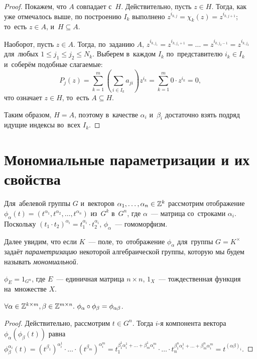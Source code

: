 \documentclass[a4paper,oneside]{article}
\begin{document}
\begin{proof}
  Покажем, что $A$ совпадает с~$H$. Действительно, пусть $z \in H$. Тогда, как уже отмечалось выше,
  по построению $I_k$ выполнено $z^{i_{k, j}} = \chi_k(z) = z^{i_{k, j + 1}}$; то~есть $z \in A$, и~$H \subseteq A$.

  Наоборот, пусть $z \in A$. Тогда, по~заданию $A$, $z^{i_{k, j_1}} = z^{i_{k, j_1 + 1}} = \ldots = z^{i_{k, j_2 - 1}} = z^{i_{k, j_2}}$
  для~любых $1 \leq j_1 \leq j_2 \leq N_k$. Выберем в~каждом $I_k$ по~представителю $i_k \in I_k$ и~соберём подобные слагаемые:
  \[
    P_j(z) = \sum_{k = 1}^{m} \left( \sum_{i \in I_k} a_{ji} \right) z^{i_k} = \sum_{k = 1}^{m} 0 \cdot z^{i_k} = 0,
  \]
  что означает $z \in H$, то~есть $A \subseteq H$.

  Таким образом, $H = A$, поэтому в~качестве $\alpha_i$ и~$\beta_i$ достаточно взять подряд идущие индексы во~всех $I_k$.
\end{proof}

\section{Мономиальные параметризации и их свойства}
Для~абелевой группы $G$ и~векторов $\alpha_1, \ldots, \alpha_n \in \mathbb{Z}^k$ рассмотрим отображение $\phi_\alpha(t) = (t^{\alpha_1}, t^{\alpha_2}, \ldots, t^{\alpha_n})$
из~$G^k$ в~$G^n$, где $\alpha$~— матрица со~строками $\alpha_i$. Поскольку $(t_1 \cdot t_2)^{\alpha_i} = t_1^{\alpha_i} \cdot t_2^{\alpha_i}$,
$\phi_\alpha$~— гомоморфизм.

Далее увидим, что если $K$~— поле, то~отображение $\phi_\alpha$ для~группы $G = K^\times$ задаёт \textit{параметризацию} некоторой алгебраической группы,
которую мы будем называть \textit{мономиальной.}

\begin{statement*}
  $\phi_{E} = 1_{G^n}$, где $E$~— единичная матрица $n \times n$, $1_X$~— тождественная функция на~множестве $X$.
\end{statement*}

\begin{statement*}
  $
    \forall \alpha \in \mathbb{Z}^{k \times m}, \beta \in \mathbb{Z}^{m \times n}.\ \phi_\alpha \circ \phi_\beta = \phi_{\alpha \beta}
  $.
\end{statement*}

\begin{proof}
  Действительно, рассмотрим $t \in G^n$. Тогда $i$-я компонента вектора $\phi_\alpha(\phi_\beta(t))$
  равна
  $ \phi_\beta^{\alpha_i}(t) = (t^{\beta_1})^{\alpha_i^1} \cdot \ldots \cdot (t^{\beta_m})^{\alpha_i^m}
                             = t_1^{\beta_1^1 \alpha_i^1 + \ldots + \beta_m^1 \alpha_i^m} \cdot
                               \ldots \cdot
                               t_n^{\beta_1^n \alpha_i^1 + \ldots + \beta_m^n \alpha_i^m}
                             = t^{(\alpha \beta)_i}.
  $
\end{proof}
\end{document}
